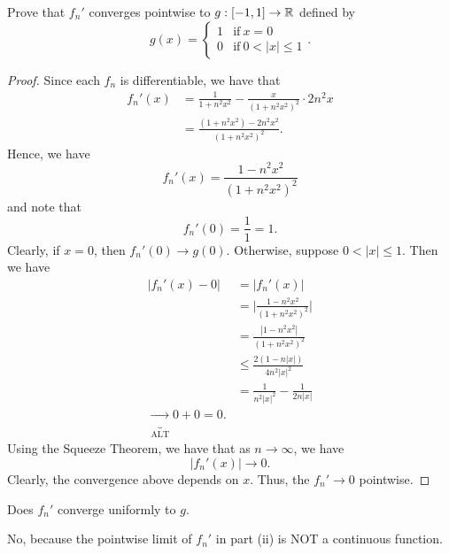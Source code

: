 \documentclass[a4paper]{article}
\begin{document}
\begin{problem}
    Prove that \( {f}_{n}' \) converges pointwise to \( g: [-1,1] \to \mathbb{R}  \) defined by  
    \[  g(x) = 
    \begin{cases}
        1 &\text{if} \ x = 0 \\
        0 &\text{if} \ 0 < | x  |  \leq 1 
    \end{cases}. \]
\end{problem}
\begin{proof}
Since each \( {f}_{n} \) is differentiable, we have that 
\begin{align*}
    {f}_{n}'(x) &= \frac{ 1  }{  1 + n^{2} x^{2} }  - \frac{ x  }{  (1 + n^{2} x^{2})^{2} } \cdot 2 n^{2} x   \\
                &= \frac{ (1 + n^{2} x^{2}) - 2 n^{2} x^{2} }{ (1 + n^{2} x^{2})^{2} }.
\end{align*}
Hence, we have 
\[  {f}_{n}'(x) = \frac{ 1 - n^{2} x^{2} }{  (1 + n^{2} x^{2})^{2} } \]
and note that 
\[  {f}_{n}'(0) = \frac{ 1  }{  1  }  = 1. \]
Clearly, if \( x = 0  \), then \( {f}_{n}'(0) \to g(0) \). Otherwise, suppose \( 0 < | x  |  \leq 1  \). Then we have
\begin{align*}
    | {f}_{n}'(x) - 0  | &= | {f}_{n}'(x) |   \\
                         &= \Big| \frac{ 1 - n^{2} x^{2} }{ (1 + n^{2} x^{2})^{2} }  \Big| \\
                         &= \frac{ | 1 - n^{2} x^{2} |   }{  (1 + n^{2} x^{2})^{2} }  \\
                         &\leq \frac{ 2 ( 1 -  n | x  | ) }{4 n^{2} | x  |^{2} }  \\
                         &= \frac{ 1  }{ n^{2} | x  |^{2}  }  - \frac{ 1  }{ 2n | x  |   }  \\
                         \underbrace{\to}_{\text{ALT}} 0 + 0 = 0. 
\end{align*}
Using the Squeeze Theorem, we have that as \( n \to \infty   \), we have 
\[  | {f}_{n}'(x) |  \to 0.  \]
Clearly, the convergence above depends on \( x  \). Thus, the \( {f}_{n}' \to  0  \) pointwise.
\end{proof}

\begin{problem}[iii]
   Does \( {f}_{n}'  \) converge uniformly to \(g  \). 
\end{problem}
\begin{solution}
No, because the pointwise limit of \( {f}_{n}'  \) in part (ii) is NOT a continuous function.
\end{solution}
\end{document}
